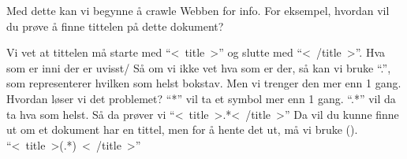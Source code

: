 \documentclass[onesided,norsk,11pt]{beamer}
\begin{document}
\begin{frame}
  Med dette kan vi begynne å crawle Webben for info.
  For eksempel, hvordan vil du prøve å finne tittelen på
  dette dokument?
  
\end{frame}

\begin{frame}
  Vi vet at tittelen må starte med ``\textless~title~\textgreater'' og slutte med
  ``\textless~/title~\textgreater''. Hva som er inni der er uvisst/
  Så om vi ikke vet hva som er der, så kan vi bruke ``.'', som
  representerer hvilken som helst bokstav. Men vi trenger den
  mer enn 1 gang. Hvordan løser vi det problemet?
  ``*'' vil ta et symbol mer enn 1 gang. ``.*'' vil da ta hva 
  som helst.
  Så da prøver vi ``\textless~title~\textgreater.*\textless~/title~\textgreater''
  Da vil du kunne finne ut om et dokument har en tittel, men for å
  hente det ut, må vi bruke ().
  ``\textless~title~\textgreater(.*)~\textless~/title~\textgreater''
\end{frame}
\end{document}
